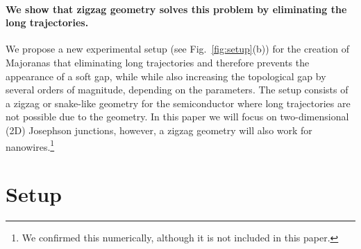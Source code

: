 \documentclass[english, twocolumn, 10pt, aps, superscriptaddress, floatfix, prb, citeautoscript]{revtex4-1}
\renewcommand{\comment}[2]{#2}
\renewcommand{\comment}{\paragraph}
\begin{document}
\comment{We show that zigzag geometry solves this problem by eliminating the long trajectories.}
We propose a new experimental setup (see Fig.~\ref{fig:setup}(b)) for the creation of Majoranas that eliminating long trajectories and therefore prevents the appearance of a soft gap, while while also increasing the topological gap by several orders of magnitude, depending on the parameters.
The setup consists of a zigzag or snake-like geometry for the semiconductor where long trajectories are not possible due to the geometry.
In this paper we will focus on two-dimensional (2D) Josephson junctions, however, a zigzag geometry will also work for nanowires.\footnote{We confirmed this numerically, although it is not included in this paper.}


\section{Setup}\label{sec:setup}
\end{document}
